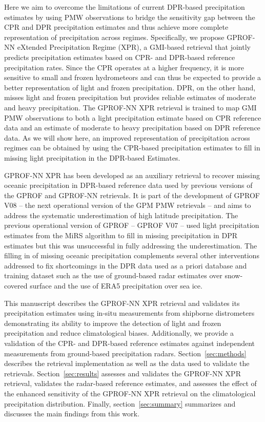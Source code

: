 \documentclass{ametsocV6.1}
\begin{document}
Here we aim to overcome the limitations of current DPR-based precipitation
estimates by using PMW observations to bridge the sensitivity gap between the
CPR and DPR precipitation estimates and thus achieve more complete
representation of precipitation across regimes. Specifically, we propose
GPROF-NN eXtended Precipitation Regime (XPR), a GMI-based retrieval that jointly
predicts precipitation estimates based on CPR- and DPR-based reference
precipitation rates. Since the CPR operates at a higher frequency, it is more
sensitive to small and frozen hydrometeors and can thus be expected to provide a
better representation of light and frozen precipitation. DPR, on the other hand,
misses light and frozen precipitation but provides reliable estimates of
moderate and heavy precipitation. The GPROF-NN XPR retrieval is trained to map
GMI PMW observations to both a light precipitation estimate based on CPR
reference data and an estimate of moderate to heavy precipitation based on DPR
reference data. As we will show here, an improved representation of
precipitation across regimes can be obtained by using the CPR-based
precipitation estimates to fill in missing light precipitation in the DPR-based
Estimates.

GPROF-NN XPR has been developed as an auxiliary retrieval to recover missing
oceanic precipitation in DPR-based reference data used by previous versions of
the GPROF and GPROF-NN \citep{pfreundschuh_gprof-nn_2022} retrievals. It is part
of the development of GPROF V08 -- the next operational version of the GPM PMW
retrievals -- and aims to address the systematic underestimation of high
latitude precipitation. The previous operational version of GPROF -- GPROF V07
-- used light precipitation estimates from the MiRS algorithm
\citep{boukabara_mirs_2011} to fill in missing precipitation in DPR estimates
but this was unsuccessful in fully addressing the underestimation. The filling
in of missing oceanic precipitation complements several other interventions
addressed to fix shortcomings in the DPR data used as a priori database and
training dataset such as the use of ground-based radar estimates over
snow-covered surface and the use of ERA5 precipitation over sea ice.

This manuscript describes the GPROF-NN XPR retrieval and validates its
precipitation estimates using in-situ measurements from shipborne distrometers
demonstrating its ability to improve the detection of light and frozen
precipitation and reduce  climatological biases. Additionally, we
provide a validation of the CPR- and DPR-based reference estimates against
independent measurements from ground-based precipitation radars.
Section~\ref{sec:methods} describes the retrieval implementation as well as the
data used to validate the retrievals. Section~\ref{sec:results} assesses and
validates the GPROF-NN XPR retrieval, validates the radar-based reference
estimates, and assesses the effect of the enhanced sensitivity of the GPROF-NN
XPR retrieval on the climatological precipitation distribution. Finally,
section~\ref{sec:summary} summarizes and discusses the main findings from this work.
\end{document}
